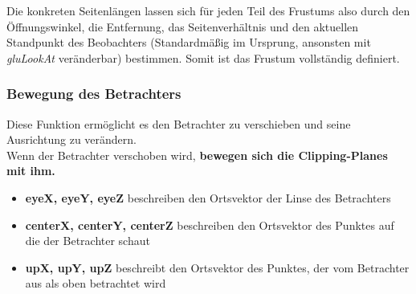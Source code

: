 Die konkreten Seitenlängen lassen sich für jeden Teil des Frustums also durch den Öffnungswinkel, die Entfernung, das Seitenverhältnis und den aktuellen Standpunkt des Beobachters (Standardmäßig im Ursprung, ansonsten mit \textit{gluLookAt} veränderbar) bestimmen. Somit ist das Frustum vollständig definiert.

\subsubsection*{Bewegung des Betrachters}



Diese Funktion ermöglicht es den Betrachter zu verschieben und seine Ausrichtung zu verändern.\\
Wenn der Betrachter verschoben wird, \textbf{bewegen sich die Clipping-Planes mit ihm.}

\begin{itemize}
    \item \textbf{eyeX, eyeY, eyeZ} beschreiben den Ortsvektor der Linse des Betrachters
    \item \textbf{centerX, centerY, centerZ} beschreiben den Ortsvektor des Punktes auf die der Betrachter schaut
    \item \textbf{upX, upY, upZ} beschreibt den Ortsvektor des Punktes, der vom Betrachter aus als oben betrachtet wird
\end{itemize}

